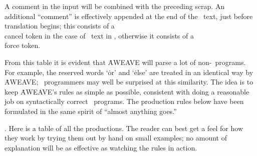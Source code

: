 A comment in the input will be combined with the preceding
scrap.
An additional ``comment'' is effectively appended at the end of the
\ADA\ text, just before translation begins; this consists of a \\{cancel}
token in the case of \ADA\ text in \ab, otherwise it consists of a
\\{force} token.

From this table it is evident that \.{AWEAVE} will parse a lot of non-\ADA\
programs. For example, the reserved words `\.{or}' and `\.{else}' are
treated in an identical way by \.{AWEAVE};
\ADA\ programmers may well be surprised at this
similarity. The idea is to keep \.{AWEAVE}'s rules as simple as possible,
consistent with doing a reasonable job on syntactically correct \ADA\
programs. The production rules below have been formulated in the same
spirit of ``almost anything goes.''

\fi

. Here is a table of all the productions. The reader can best get a feel
for
how they work by trying them out by hand on small examples; no amount of
explanation will be as effective as watching the rules in action.

